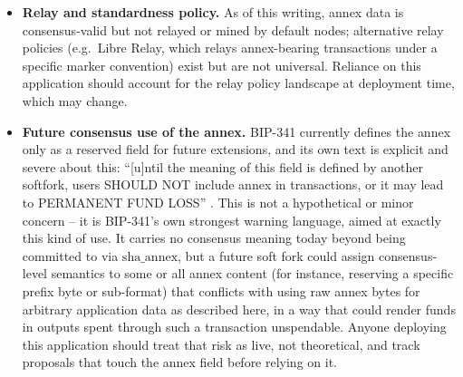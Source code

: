 \begin{itemize}
\item \textbf{Relay and standardness policy.} As of this writing, annex
  data is consensus-valid but not relayed or mined by default nodes;
  alternative relay policies (e.g.\ Libre Relay, which relays annex-bearing
  transactions under a specific marker convention) exist but are not
  universal. Reliance on this application should account for the relay
  policy landscape at deployment time, which may change.
\item \textbf{Future consensus use of the annex.} BIP-341 currently defines
  the annex only as a reserved field for future extensions, and its own
  text is explicit and severe about this: ``[u]ntil the meaning of this
  field is defined by another softfork, users SHOULD NOT include annex in
  transactions, or it may lead to PERMANENT FUND LOSS'' \citep{bip341}.
  This is not a hypothetical or minor concern -- it is BIP-341's own
  strongest warning language, aimed at exactly this kind of use. It carries
  no consensus meaning today beyond being committed to via
  $\mathrm{sha\_annex}$, but a future soft fork could assign consensus-level
  semantics to some or all annex content (for instance, reserving a
  specific prefix byte or sub-format) that conflicts with using raw annex
  bytes for arbitrary application data as described here, in a way that
  could render funds in outputs spent through such a transaction
  unspendable. Anyone deploying this application should treat that risk as
  live, not theoretical, and track proposals that touch the annex field
  before relying on it.
\end{itemize}
